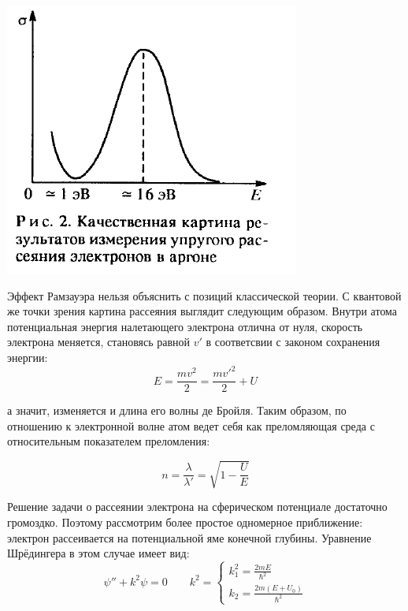 \documentclass[a4paper,12pt]{article}
\begin{document}
	\begin{center}
		\includegraphics[]{princip.png}
	\end{center}
	
	
	Эффект Рамзауэра нельзя объяснить с позиций классической теории. С квантовой же точки зрения картина рассеяния выглядит следующим образом. Внутри атома потенциальная энергия налетающего электрона отлична от нуля, скорость электрона меняется, становясь равной $v'$ в соответсвии с законом сохранения энергии:
	\begin{equation}
	E = \frac{mv^2}{2} = \frac{mv'^2}{2} + U
	\end{equation}
	
	а значит, изменяется и длина его волны де Бройля. Таким образом, по отношению к электронной волне атом ведет себя как преломляющая среда с относительным показателем преломления:
	
	\begin{equation}
	n = \frac{\lambda}{\lambda'} = \sqrt{1 - \frac{U}{E}}
	\end{equation}
	
	Решение задачи о рассеянии электрона на сферическом потенциале достаточно громоздко. Поэтому рассмотрим более простое одномерное приближение: электрон рассеивается на потенциальной яме конечной глубины. Уравнение Шрёдингера в этом случае имеет вид:
	\begin{equation}
	\psi'' + k^2\psi = 0 \qquad k^2 = \begin{cases}
	k_1^2  = \frac{2mE}{\hbar^2} \\
	k_2 = \frac{2m(E+U_0)}{\hbar^2}
	\end{cases}
	\end{equation}
	
\end{document}
